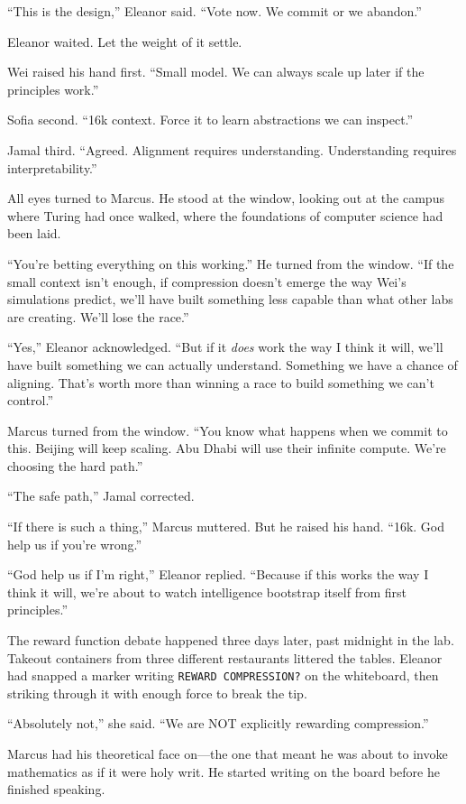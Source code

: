 ``This is the design,'' Eleanor said. ``Vote now. We commit or we abandon.''

Eleanor waited. Let the weight of it settle.

Wei raised his hand first. ``Small model. We can always scale up later if the principles work.''

Sofia second. ``16k context. Force it to learn abstractions we can inspect.''

Jamal third. ``Agreed. Alignment requires understanding. Understanding requires interpretability.''

All eyes turned to Marcus. He stood at the window, looking out at the campus where Turing had once walked, where the foundations of computer science had been laid.

``You're betting everything on this working.'' He turned from the window. ``If the small context isn't enough, if compression doesn't emerge the way Wei's simulations predict, we'll have built something less capable than what other labs are creating. We'll lose the race.''

``Yes,'' Eleanor acknowledged. ``But if it \emph{does} work the way I think it will, we'll have built something we can actually understand. Something we have a chance of aligning. That's worth more than winning a race to build something we can't control.''

Marcus turned from the window. ``You know what happens when we commit to this. Beijing will keep scaling. Abu Dhabi will use their infinite compute. We're choosing the hard path.''

``The safe path,'' Jamal corrected.

``If there is such a thing,'' Marcus muttered. But he raised his hand. ``16k. God help us if you're wrong.''

``God help us if I'm right,'' Eleanor replied. ``Because if this works the way I think it will, we're about to watch intelligence bootstrap itself from first principles.''

\scenebreak

The reward function debate happened three days later, past midnight in the lab. Takeout containers from three different restaurants littered the tables. Eleanor had snapped a marker writing \texttt{REWARD COMPRESSION?} on the whiteboard, then striking through it with enough force to break the tip.

``Absolutely not,'' she said. ``We are NOT explicitly rewarding compression.''

Marcus had his theoretical face on---the one that meant he was about to invoke mathematics as if it were holy writ. He started writing on the board before he finished speaking.

